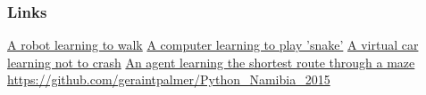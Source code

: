\documentclass{beamer}
\begin{document}
  \begin{frame}
  	\frametitle{Links}
	\href{https://www.youtube.com/watch?v=CthhCy-1Jeg}{A robot learning to walk} \newline
	\href{https://www.youtube.com/watch?v=kM89G5dE-og}{A computer learning to play 'snake'} \newline
	\href{https://www.youtube.com/watch?v=zOgSC---rgM}{A virtual car learning not to crash} \newline
	\href{https://www.youtube.com/watch?v=X33xYf4UlVw}{An agent learning the shortest route through a maze} \newline
	\newline
	\href{https://github.com/geraintpalmer/Python_Namibia_2015}{https://github.com/geraintpalmer/Python\_Namibia\_2015}
	\end{frame}
  
\end{document}
